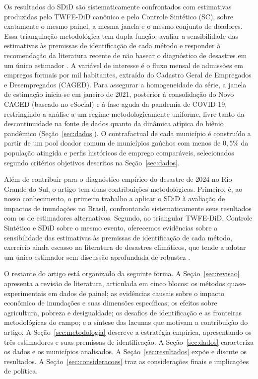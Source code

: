 \documentclass[a4paper,12pt]{article}
\begin{document}
Os resultados do SDiD são sistematicamente confrontados com estimativas produzidas
pelo TWFE-DiD canônico e pelo Controle Sintético (SC), sobre exatamente o mesmo
painel, a mesma janela e o mesmo conjunto de doadores. Essa triangulação metodológica
tem dupla função: avaliar a sensibilidade das estimativas às premissas de identificação de
cada método e responder à recomendação da literatura recente de não basear o diagnóstico
de desastres em um único estimador \cite{botzen2019}. A variável de interesse é o fluxo
mensal de admissões em empregos formais por mil habitantes, extraído do Cadastro Geral
de Empregados e Desempregados (CAGED). Para assegurar a homogeneidade da série, a janela
de estimação inicia-se em janeiro de 2021, posterior à consolidação do Novo CAGED
(baseado no eSocial) e à fase aguda da pandemia de COVID-19, restringindo a análise a um
regime metodologicamente uniforme, livre tanto da descontinuidade na fonte de dados
quanto da dinâmica atípica do biênio pandêmico (Seção~\ref{sec:dados}). O contrafactual de
cada município é construído a partir de um pool doador comum de municípios gaúchos
com menos de $0{,}5\%$ da população atingida
e perfis históricos de emprego comparáveis, selecionados segundo
critérios objetivos descritos na Seção~\ref{sec:dados}.

Além de contribuir para o diagnóstico empírico do desastre de 2024 no Rio Grande do Sul,
o artigo tem duas contribuições metodológicas. Primeiro, é, ao nosso conhecimento, o
primeiro trabalho a aplicar o SDiD à avaliação de impactos de inundações no Brasil,
confrontando sistematicamente seus resultados com os de estimadores alternativos.
Segundo, ao triangular TWFE-DiD, Controle Sintético e SDiD sobre o mesmo evento,
oferecemos evidências sobre a sensibilidade das estimativas às premissas de identificação
de cada método, exercício ainda escasso na literatura de desastres climáticos, que tende
a adotar um único estimador sem discussão aprofundada de robustez \cite{botzen2019}.

O restante do artigo está organizado da seguinte forma. A Seção~\ref{sec:revisao}
apresenta a revisão de literatura, articulada em cinco blocos: os métodos
quase-experimentais em dados de painel; as evidências causais sobre o impacto econômico
de inundações e suas dimensões específicas; os efeitos sobre agricultura, pobreza e
desigualdade; os desafios de identificação e as fronteiras metodológicas do campo; e a
síntese das lacunas que motivam a contribuição do artigo. A Seção~\ref{sec:metodologia}
descreve a estratégia empírica, apresentando os três estimadores e suas premissas de
identificação. A Seção~\ref{sec:dados} caracteriza os dados e os municípios analisados. A
Seção~\ref{sec:resultados} expõe e discute os resultados. A
Seção~\ref{sec:consideracoes} traz as considerações finais e implicações de política.
\end{document}
